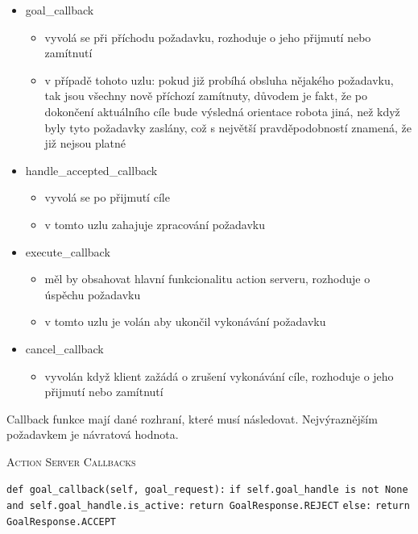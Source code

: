 \newpage
\begin{itemize}[leftmargin=*]
	\item{goal\_callback}
	\vspace*{-0.5em}
	\begin{itemize}
		\item{vyvolá se při příchodu požadavku, rozhoduje o jeho přijmutí nebo zamítnutí}
		\item{v případě tohoto uzlu: pokud již probíhá obsluha nějakého požadavku, tak jsou všechny nově příchozí zamítnuty, důvodem je fakt, že po dokončení aktuálního cíle bude výsledná orientace robota jiná, než když byly tyto požadavky zaslány, což s největší pravděpodobností znamená, že již nejsou platné}
	\end{itemize}
	\item{handle\_accepted\_callback}
	\vspace*{-0.5em}
	\begin{itemize}
		\item{vyvolá se po přijmutí cíle}
		\item{v tomto uzlu zahajuje zpracování požadavku}
	\end{itemize}
	\item{execute\_callback}
	\vspace*{-0.5em}
	\begin{itemize}
		\item{měl by obsahovat hlavní funkcionalitu action serveru, rozhoduje o úspěchu požadavku}
		\item{v tomto uzlu je volán aby ukončil vykonávání požadavku}
	\end{itemize}
	\item{cancel\_callback}
	\vspace*{-0.5em}
	\begin{itemize}
		\item{vyvolán když klient zažádá o zrušení vykonávání cíle, rozhoduje o jeho přijmutí nebo zamítnutí}
	\end{itemize}
\end{itemize} 

Callback funkce mají dané rozhraní, které musí následovat. Nejvýraznějším požadavkem je návratová hodnota.
\begin{algorithm}[h!]
	\label{}
	\caption{\textsc{Action Server Callbacks}}
	
	\DontPrintSemicolon
	\SetAlgoNoLine
	\SetNlSty{}{}{:}
	\SetNlSkip{-1.1em}
	
	\BlankLine \Indp\Indpp
	
	\texttt{def goal\_callback(self, goal\_request):}\;
	\Indp\Indp
	\texttt{if self.goal\_handle is not None and self.goal\_handle.is\_active:}\;
	\Indp\Indp
	\texttt{return GoalResponse.REJECT}\;
	\Indm\Indm
	\texttt{else:}\;
	\Indp\Indp
	\texttt{return GoalResponse.ACCEPT}\;

\end{algorithm}

